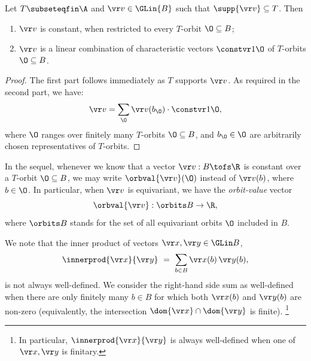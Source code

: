 \begin{lemma} \label{lem:1O}
Let $T\subseteqfin \A$ and $\vr v \in \GLin {B}$ such that $\supp {\vr v}\subseteq T$. Then
\begin{enumerate}
\item[(i)] $\vr v$ is constant, when restricted to every $T$-orbit $\O\subseteq B$;
\item[(ii)] $\vr v$ is a linear combination of characteristic vectors $\constvr 1 \O$ of $T$-orbits $\O\subseteq B$.
\end{enumerate}
\end{lemma}
%
\begin{proof}
%
The first part follows immediately as $T$ supports ${\vr v}$.
As required in the second part, we have:
\begin{align} \label{eq:1O}
\vr v = \sum_\O \vr v(b_\O) \cdot \constvr 1 \O,
\end{align}
where $\O$ ranges over finitely many %
$T$-orbits $\O\subseteq B$, and 
$b_{\O}\in\O$ are arbitrarily chosen representatives of $T$-orbits. 
\end{proof}
%
%
\begin{notation} \label{not:orbval}
In the sequel, whenever we know that a vector $\vr v : B\tofs \R$ is constant over a $T$-orbit
$\O \subseteq B$,
we may write $\orbval{\vr v}(\O)$ instead of $\vr v(b)$, where $b\in\O$.
In particular, when $\vr v$ is equivariant, we have the \emph{orbit-value} vector
\[
\orbval{\vr v} : \orbits B \to \R,
\]
where $\orbits B$ stands for the set of all equivariant orbits $\O$ included in $B$.
\end{notation}


We note that the inner product of  vectors $\vr x, \vr y\in\GLin B$, 
\[
\innerprod {\vr x} {\vr y} \ = \ \sum_{b\in B} \vr x(b)\, \vr y(b),
\]
is not always well-defined.
We consider the right-hand side sum as well-defined when there are only finitely many $b\in B$
for which both $\vr x(b)$ and $\vr y(b)$ are non-zero
(equivalently, the intersection $\dom {\vr x} \cap \dom {\vr y}$ is finite).%
\footnote{In particular, $\innerprod {\vr x} {\vr y}$ is always well-defined when one of $\vr x, \vr y$ is finitary.}

